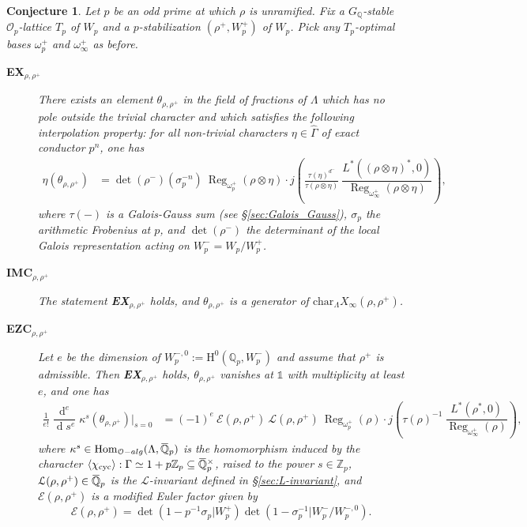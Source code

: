 \documentclass[12pt]{amsart}
\newcommand\bQ{\mathbb{Q}}
\newcommand\Zp{{\mathbb{Z}_p}}
\newcommand\Qp{{\mathbb{Q}_p}}
\newcommand\cE{\mathcal{E}}
\newcommand\cL{\mathcal{L}}
\newcommand\cO{\mathcal{O}}
\newcommand{\ob}[1]{\mkern 1.5mu\overline{\mkern-1.5mu#1\mkern-1.5mu}\mkern 1.5mu}
\newcommand{\alg}{\textrm{alg}}
\renewcommand{\char}{\textrm{char}}
\DeclareMathOperator{\Hom}{Hom}
\DeclareMathOperator{\Reg}{Reg}
\DeclareMathOperator{\cyc}{cyc}
\DeclareMathOperator{\diff}{d}
\newcommand{\HH}{\mathrm{H}}
\theoremstyle{defstyle}
\theoremstyle{thmstyle}
\newtheorem{CONJ}{Conjecture}
\begin{document}
\begin{CONJ}\label{conj:IMC}
	Let $p$ be an odd prime at which $\rho$ is unramified. Fix a $G_{\bQ}$-stable $\cO_p$-lattice $T_p$ of $W_p$ and a $p$-stabilization $(\rho^+,W_p^+)$ of $W_p$. Pick any $T_p$-optimal bases $\omega_p^+$ and $\omega_\infty^+$ as before. 
	\begin{description}
		\item[\textbf{EX}$_{\rho,\rho^+}$]
		 There exists an element $\theta_{\rho,\rho^+}$ in the field of fractions of $\Lambda$ which has no pole outside the trivial character and which satisfies the following interpolation property: for all non-trivial characters $\eta\in\widehat{\Gamma}$ of exact conductor $p^{n}$, one has 
	$$\begin{aligned}
	\eta(\theta_{\rho,\rho^+})&= {\det(\rho^-)(\sigma_p^{-n})} \ \Reg_{\omega_p^+}(\rho\otimes\eta)\cdot j\left(\frac{\tau(\eta)^{d^-}}{\tau(\rho\otimes\eta)} \ \dfrac{L^{*}\left((\rho \otimes \eta)^*,0\right)}{\Reg_{\omega_\infty^+}(\rho\otimes\eta)}\right),
	\end{aligned}$$
	where $\tau(-)$ is a Galois-Gauss sum (see \S\ref{sec:Galois_Gauss}), $\sigma_p$ the arithmetic Frobenius at $p$, and $\det(\rho^-)$ the determinant of the local Galois representation acting on $W_p^-=W_p/W_p^+$.
	\item[\textbf{IMC}$_{\rho,\rho^+}$] The statement \textbf{EX}$_{\rho,\rho^+}$ holds, and  $\theta_{\rho,\rho^+}$ is a generator of $\char_\Lambda X_\infty(\rho,\rho^+)$.
\item[\textbf{EZC}$_{\rho,\rho^+}$] Let $e$ be the dimension of $W_p^{-,0}:=\HH^0(\Qp,W_p^-)$ and assume that $\rho^+$ is admissible. Then \textbf{EX}$_{\rho,\rho^+}$ holds, $\theta_{\rho,\rho^+}$ vanishes at $\mathds{1}$ with multiplicity at least $e$, and one has
$$\begin{aligned}
\frac{1}{e!} \dfrac{\diff^e}{\diff \!s^e}\kappa^s(\theta_{\rho,\rho^+})\bigg|_{s=0}&=  (-1)^e \ \cE(\rho,\rho^+) \ \cL(\rho,\rho^+) \ \Reg_{\omega_p^+}(\rho) \cdot j\left( \tau(\rho)^{-1}\ \dfrac{L^{*}\left(\rho^*,0\right)}{\Reg_{\omega_\infty^+}(\rho)}\right),
\end{aligned}$$
where $\kappa^s\in\Hom_{\cO-\alg}(\Lambda,\ob{\bQ}_p)$ is the homomorphism induced by the character $\langle\chi_{\cyc}\rangle : \Gamma \simeq 1+p\Zp \subseteq \ob{\bQ}_p^\times$, raised to the power $s\in \Zp$,  $\cL(\rho,\rho^+)\in\ob{\bQ}_p$ is the $\cL$-invariant defined in \S\ref{sec:L-invariant}, and  $\cE(\rho,\rho^+)$ is a modified Euler factor given by
$$\cE(\rho,\rho^+)=\det(1-p^{-1}\sigma_p\big|W_p^+) \det(1-\sigma_p^{-1}\big|W_p^-/W_p^{-,0}).$$
	\end{description}
\end{CONJ}
\end{document}
